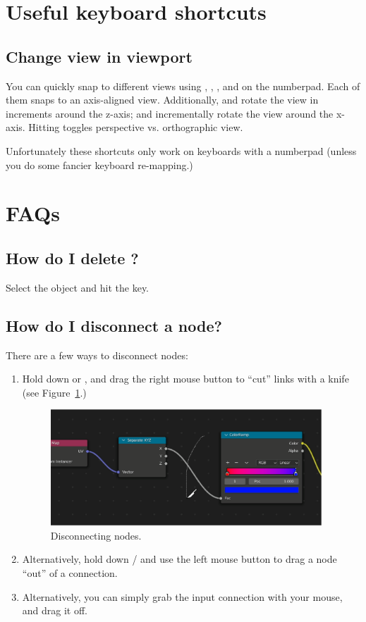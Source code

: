 \documentclass[10pt]{article}
\begin{document}
\section{Useful keyboard shortcuts}

\subsection{Change view in viewport}
You can quickly snap to different views using , , , and  on the numberpad. Each of them snaps to an axis-aligned view. Additionally,  and  rotate the view in increments around the z-axis;  and  incrementally rotate the view around the x-axis. Hitting  toggles perspective vs. orthographic view.

Unfortunately these shortcuts only work on keyboards with a numberpad (unless you do some fancier keyboard re-mapping.)

\section{FAQs}
\subsection{How do I delete \underline{\hspace{1cm}}?}
Select the object and hit the  key.

\subsection{How do I disconnect a node?}
There are a few ways to disconnect nodes:
\begin{enumerate}
    \item Hold down \keys{\ctrl} or \keys{\cmd}, and drag the right mouse button to ``cut'' links with a knife (see Figure~\ref{fig:disconnect_node}.)
    \begin{figure}[H]
        \centering
        \captionsetup{width=0.8\textwidth}
        \includegraphics[width=4in]{images/disconnect-node.png}
        \caption{Disconnecting nodes.}
        \label{fig:disconnect_node}
    \end{figure}
    \item Alternatively, hold down / and use the left mouse button to drag a node ``out'' of a connection.
    \item Alternatively, you can simply grab the input connection with your mouse, and drag it off.
\end{enumerate}
\end{document}
